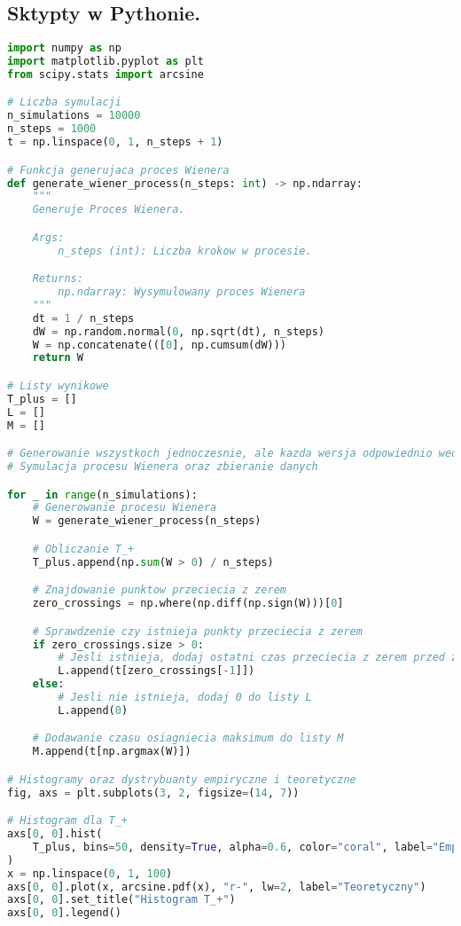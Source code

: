 \documentclass[12pt,letterpaper]{article}
\theoremstyle{definition}
\begin{document}
\subsection{Sktypty w Pythonie.}
\begin{lstlisting}[language=Python, caption=Skrypt Zad 6.]
import numpy as np
import matplotlib.pyplot as plt
from scipy.stats import arcsine

# Liczba symulacji
n_simulations = 10000
n_steps = 1000
t = np.linspace(0, 1, n_steps + 1)

# Funkcja generujaca proces Wienera
def generate_wiener_process(n_steps: int) -> np.ndarray:
    """
    Generuje Proces Wienera.

    Args:
        n_steps (int): Liczba krokow w procesie.

    Returns:
        np.ndarray: Wysymulowany proces Wienera
    """
    dt = 1 / n_steps
    dW = np.random.normal(0, np.sqrt(dt), n_steps)
    W = np.concatenate(([0], np.cumsum(dW)))
    return W

# Listy wynikowe
T_plus = []
L = []
M = []

# Generowanie wszystkoch jednoczesnie, ale kazda wersja odpowiednio wedlug swojej definicji
# Symulacja procesu Wienera oraz zbieranie danych

for _ in range(n_simulations):
    # Generowanie procesu Wienera
    W = generate_wiener_process(n_steps)

    # Obliczanie T_+
    T_plus.append(np.sum(W > 0) / n_steps)

    # Znajdowanie punktow przeciecia z zerem
    zero_crossings = np.where(np.diff(np.sign(W)))[0]

    # Sprawdzenie czy istnieja punkty przeciecia z zerem
    if zero_crossings.size > 0:
        # Jesli istnieja, dodaj ostatni czas przeciecia z zerem przed zakonczeniem symulacji do listy L
        L.append(t[zero_crossings[-1]])
    else:
        # Jesli nie istnieja, dodaj 0 do listy L
        L.append(0)

    # Dodawanie czasu osiagniecia maksimum do listy M
    M.append(t[np.argmax(W)])

# Histogramy oraz dystrybuanty empiryczne i teoretyczne
fig, axs = plt.subplots(3, 2, figsize=(14, 7))

# Histogram dla T_+
axs[0, 0].hist(
    T_plus, bins=50, density=True, alpha=0.6, color="coral", label="Empiryczny"
)
x = np.linspace(0, 1, 100)
axs[0, 0].plot(x, arcsine.pdf(x), "r-", lw=2, label="Teoretyczny")
axs[0, 0].set_title("Histogram T_+")
axs[0, 0].legend()


\end{lstlisting}
\end{document}
